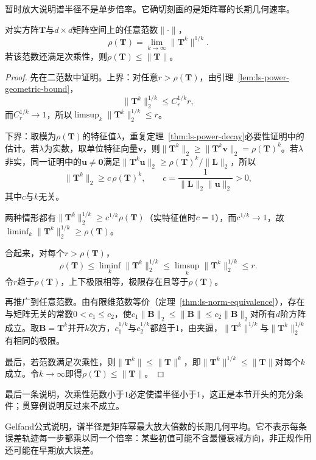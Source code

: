 暂时放大说明谱半径不是单步倍率。它确切刻画的是矩阵幂的长期几何速率。
\begin{theorem}[Gelfand公式]
\label{thm:ls-gelfand-formula}
对实方阵$\bm T$与$d\times d$矩阵空间上的任意范数$\lVert\cdot\rVert$，
\begin{equation}
 \rho(\bm T)=\lim_{k\to\infty}\lVert\bm T^k\rVert^{1/k}.
 \label{eq:ls-gelfand-formula}
\end{equation}
若该范数还满足次乘性，则$\rho(\bm T)\leq\lVert\bm T\rVert$。
\end{theorem}
\begin{proof}
先在二范数中证明。上界：对任意$r>\rho(\bm T)$，由引理~\ref{lem:ls-power-geometric-bound}，
\[
 \lVert\bm T^k\rVert_2^{1/k}\leq C_r^{1/k}r ,
\]
而$C_r^{1/k}\to1$，所以$\limsup_k\lVert\bm T^k\rVert_2^{1/k}\leq r$。

下界：取模为$\rho(\bm T)$的特征值$\lambda$，重复定理~\ref{thm:ls-power-decay}必要性证明中的估计。若$\lambda$为实数，取单位特征向量$\bm v$，则$\lVert\bm T^k\rVert_2\geq\lVert\bm T^k\bm v\rVert_2=\rho(\bm T)^k$。若$\lambda$非实，同一证明中的$\bm u\neq\bm0$满足$\lVert\bm T^k\bm u\rVert_2\geq\rho(\bm T)^k/\lVert\bm L\rVert_2$，所以
\[
 \lVert\bm T^k\rVert_2\geq c\,\rho(\bm T)^k,\qquad c=\frac1{\lVert\bm L\rVert_2\lVert\bm u\rVert_2}>0 ,
\]
其中$c$与$k$无关。

两种情形都有$\lVert\bm T^k\rVert_2^{1/k}\geq c^{1/k}\rho(\bm T)$（实特征值时$c=1$），而$c^{1/k}\to1$，故$\liminf_k\lVert\bm T^k\rVert_2^{1/k}\geq\rho(\bm T)$。

合起来，对每个$r>\rho(\bm T)$，
\[
 \rho(\bm T)\leq\liminf_k\lVert\bm T^k\rVert_2^{1/k}\leq\limsup_k\lVert\bm T^k\rVert_2^{1/k}\leq r .
\]
令$r$趋于$\rho(\bm T)$，上下极限相等，极限存在且等于$\rho(\bm T)$。

再推广到任意范数。由有限维范数等价（定理~\ref{thm:ls-norm-equivalence}），存在与矩阵无关的常数$0<c_1\leq c_2$，使$c_1\lVert\bm B\rVert_2\leq\lVert\bm B\rVert\leq c_2\lVert\bm B\rVert_2$对所有$d$阶方阵成立。取$\bm B=\bm T^k$并开$k$次方，$c_1^{1/k}$与$c_2^{1/k}$都趋于$1$，由夹逼，$\lVert\bm T^k\rVert^{1/k}$与$\lVert\bm T^k\rVert_2^{1/k}$有相同的极限。

最后，若范数满足次乘性，则$\lVert\bm T^k\rVert\leq\lVert\bm T\rVert^k$，即$\lVert\bm T^k\rVert^{1/k}\leq\lVert\bm T\rVert$对每个$k$成立。令$k\to\infty$即得$\rho(\bm T)\leq\lVert\bm T\rVert$。
\end{proof}
最后一条说明，次乘性范数小于$1$必定使谱半径小于$1$，这正是本节开头的充分条件；贯穿例说明反过来不成立。

Gelfand公式说明，谱半径是矩阵幂最大放大倍数的长期几何平均。它不表示每条误差轨迹每一步都乘以同一个倍率：某些初值可能不含最慢衰减方向，非正规作用还可能在早期放大误差。

